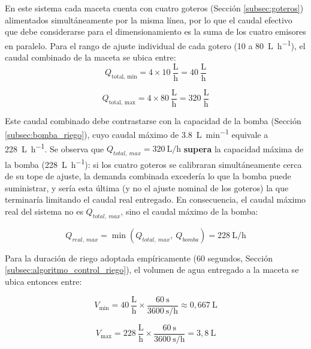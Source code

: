 En este sistema cada maceta cuenta con cuatro goteros (Sección \ref{subsec:goteros}) alimentados simultáneamente por la misma línea, por lo que el caudal efectivo que debe considerarse para el dimensionamiento es la suma de los cuatro emisores en paralelo. Para el rango de ajuste individual de cada gotero (10 a \SI{80}{\liter\per\hour}), el caudal combinado de la maceta se ubica entre:
\begin{equation}
\label{eq:caudal_total_min}
Q_{\text{total, min}} = 4 \times 10\ \frac{\text{L}}{\text{h}} = 40\ \frac{\text{L}}{\text{h}}
\end{equation}

\begin{equation}
\label{eq:caudal_total_max}
Q_{\text{total, max}} = 4 \times 80\ \frac{\text{L}}{\text{h}} = 320\ \frac{\text{L}}{\text{h}}
\end{equation}

Este caudal combinado debe contrastarse con la capacidad de la bomba (Sección \ref{subsec:bomba_riego}), cuyo caudal máximo de \SI{3.8}{\liter\per\minute} equivale a \SI{228}{\liter\per\hour}. Se observa que $Q_{total,\ max} = \SI{320}{\liter\per\hour}$ \textbf{supera} la capacidad máxima de la bomba (\SI{228}{\liter\per\hour}): si los cuatro goteros se calibraran simultáneamente cerca de su tope de ajuste, la demanda combinada excedería lo que la bomba puede suministrar, y sería esta última (y no el ajuste nominal de los goteros) la que terminaría limitando el caudal real entregado. En consecuencia, el caudal máximo real del sistema no es $Q_{total,\ max}$, sino el caudal máximo de la bomba:

\begin{equation}
    Q_{real,\ max} = \min(Q_{total,\ max},\ Q_{bomba}) = \SI{228}{\liter\per\hour}
    \label{eq:caudal_real_max}
\end{equation}

Para la duración de riego adoptada empíricamente (60 segundos, Sección \ref{subsec:algoritmo_control_riego}), el volumen de agua entregado a la maceta se ubica entonces entre:

\begin{equation}
\label{eq:volumen_riego_min}
V_{\text{min}} = 40\ \frac{\text{L}}{\text{h}} \times \frac{60\ \text{s}}{3600\ \text{s/h}}
\approx 0{,}667\ \text{L}
\end{equation}

\begin{equation}
\label{eq:volumen_riego_max}
V_{\text{max}} = 228\ \frac{\text{L}}{\text{h}} \times \frac{60\ \text{s}}{3600\ \text{s/h}}
= 3{,}8\ \text{L}
\end{equation}

